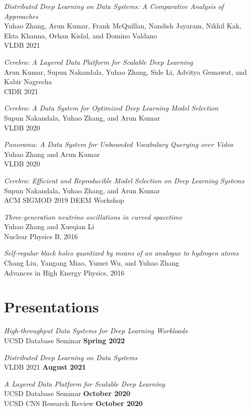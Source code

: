 \documentclass[margin,line]{res}
\begin{document}
\begin{resume}
\textit{Distributed Deep Learning on Data Systems: A Comparative Analysis of Approaches}\\
Yuhao Zhang, Arun Kumar, Frank McQuillan, Nandish Jayaram, Nikhil Kak, Ekta Khanna, Orhan Kislal, and Domino Valdano\\
VLDB 2021

\textit{Cerebro: A Layered Data Platform for Scalable Deep Learning}\\
Arun Kumar, Supun Nakandala, Yuhao Zhang, Side Li, Advitya Gemawat, and Kabir Nagrecha\\
CIDR 2021

\textit{Cerebro: A Data System for Optimized Deep Learning Model Selection}\\
Supun Nakandala, Yuhao Zhang, and Arun Kumar\\
VLDB 2020

\textit{Panorama: A Data System for Unbounded Vocabulary Querying over Video}\\
Yuhao Zhang and Arun Kumar\\
VLDB 2020

\textit{Cerebro: Efficient and Reproducible Model Selection on Deep Learning Systems}\\
Supun Nakandala, Yuhao Zhang, and Arun Kumar\\
ACM SIGMOD 2019 DEEM Workshop

\textit{Three-generation neutrino oscillations in curved spacetime}\\
Yuhao Zhang and Xueqian Li\\
Nuclear Physics B, 2016

\textit{Self-regular black holes quantized by means of an analogue to hydrogen atoms}\\
Chang Liu, Yangang Miao, Yumei Wu, and Yuhao Zhang\\
Advances in High Energy Physics, 2016

\section{\sc Presentations}
\textit{High-throughput Data Systems for Deep Learning Workloads}\\
UCSD Database Seminar \hfill {\bf Spring 2022}

\textit{Distributed Deep Learning on Data Systems}\\
VLDB 2021 \hfill {\bf August 2021}

\textit{A Layered Data Platform for Scalable Deep Learning}\\
UCSD Database Seminar \hfill {\bf October 2020}\\
UCSD CNS Research Review \hfill {\bf October 2020}


\end{resume}
\end{document}
